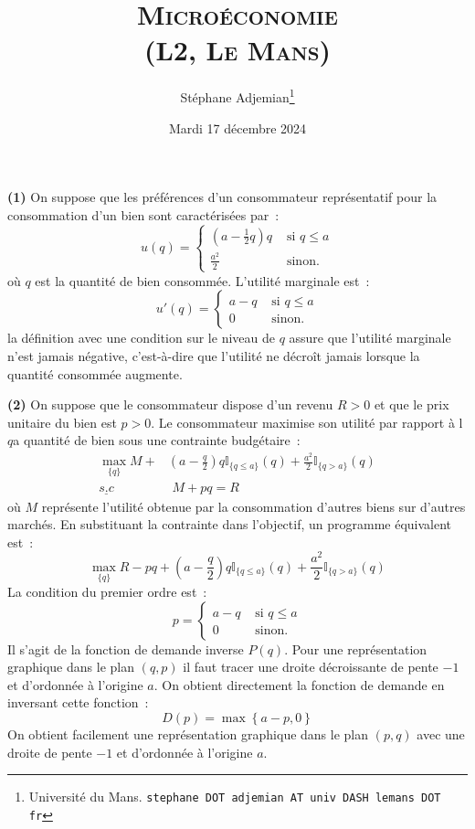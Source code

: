 \documentclass[10pt,a4paper,notitlepage,twocolumn]{article}
\newcommand{\question}[1]{\textbf{(#1)}}
\begin{document}
\title{\textsc{Microéconomie\\ \small{(L2, Le Mans)}}}
\author{Stéphane Adjemian\thanks{Université du Mans. \texttt{stephane
DOT adjemian AT univ DASH lemans DOT fr}}}
\date{Mardi 17 décembre 2024}

\maketitle

\thispagestyle{empty}

\bigskip


\bigskip
\bigskip

\question{1} On suppose que les préférences d'un consommateur
représentatif pour la consommation d'un bien sont caractérisées par~:
\[
  u(q) =
  \begin{cases}
    \left( a - \frac{1}{2}q \right)q &\text{ si } q\leq a\\
    \frac{a^2}{2} &\text{ sinon.}
  \end{cases}
\]
où $q$ est la quantité de bien consommée. L'utilité marginale est~:
\[
  u'(q) =
  \begin{cases}
    a-q &\text{ si } q\leq a\\
    0 &\text{ sinon.}
  \end{cases}
\]
la définition avec une condition sur le niveau de $q$ assure que
l'utilité marginale n'est jamais négative, c'est-à-dire que l'utilité
ne décroît jamais lorsque la quantité consommée augmente.\newline

\question{2} On suppose que le consommateur dispose d'un revenu $R>0$
et que le prix unitaire du bien est $p>0$. Le consommateur maximise son utilité par rapport à l$q$a quantité de bien sous une contrainte budgétaire~:
\[
  \begin{split}
    \max_{\{q\}} M + &\left(a-\frac{q}{2}\right)q \mathbb I_{\{q\leq a\}}(q) + \frac{a^2}{2}\mathbb I_{\{q> a\}}(q)\\
    \underline{s.c}&\,\, M+pq = R
  \end{split}
\]
où $M$ représente l'utilité obtenue par la consommation d'autres biens sur d'autres marchés. En substituant la contrainte dans l'objectif, un programme équivalent est~:
\[
    \max_{\{q\}} R-pq + \left(a-\frac{q}{2}\right)q \mathbb I_{\{q\leq a\}}(q) + \frac{a^2}{2}\mathbb I_{\{q> a\}}(q)
\]
La condition du premier ordre est~:
\[
  p =
  \begin{cases}
    a-q &\text{ si }q\leq a\\
    0 &\text{ sinon.}
  \end{cases}
\]
Il s'agit de la fonction de demande inverse $P(q)$. Pour une représentation graphique dans le plan $(q,p)$ il faut tracer une droite décroissante de pente $-1$ et d'ordonnée à l'origine $a$. On obtient directement la fonction de demande en inversant cette fonction~:
\[
  D(p) = \max\left\{ a-p, 0 \right\}
\]
On obtient facilement une représentation graphique dans le plan $(p,q)$ avec une droite de pente $-1$ et d'ordonnée à l'origine $a$.\newline
\end{document}

